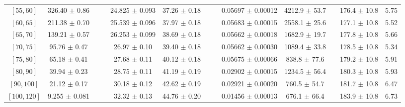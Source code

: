 \begin{tabular}{c||c|c|c|c|c|c|c|c|c|c|c||c}
$[55, 60]$ & 326.40 $\pm$ 0.86 &  &  & 24.825 $\pm$ 0.093 & 37.26 $\pm$ 0.18 &  &  & 0.05697 $\pm$ 0.00012 & 4212.9 $\pm$ 53.7 &  & 176.4 $\pm$ 10.8 & 5.75\\
$[60, 65]$ & 211.38 $\pm$ 0.70 &  &  & 25.539 $\pm$ 0.096 & 37.97 $\pm$ 0.18 &  &  & 0.05683 $\pm$ 0.00015 & 2558.1 $\pm$ 25.6 &  & 177.1 $\pm$ 10.8 & 5.52\\
$[65, 70]$ & 139.21 $\pm$ 0.57 &  &  & 26.253 $\pm$ 0.099 & 38.69 $\pm$ 0.18 &  &  & 0.05662 $\pm$ 0.00018 & 1682.9 $\pm$ 19.7 &  & 177.8 $\pm$ 10.8 & 5.66\\
$[70, 75]$ & 95.76 $\pm$ 0.47 &  &  & 26.97 $\pm$ 0.10 & 39.40 $\pm$ 0.18 &  &  & 0.05662 $\pm$ 0.00030 & 1089.4 $\pm$ 33.8 &  & 178.5 $\pm$ 10.8 & 5.34\\
$[75, 80]$ & 65.18 $\pm$ 0.41 &  &  & 27.68 $\pm$ 0.11 & 40.12 $\pm$ 0.18 &  &  & 0.05675 $\pm$ 0.00066 & 838.8 $\pm$ 77.6 &  & 179.2 $\pm$ 10.8 & 5.91\\
$[80, 90]$ & 39.94 $\pm$ 0.23 &  &  & 28.75 $\pm$ 0.11 & 41.19 $\pm$ 0.19 &  &  & 0.02902 $\pm$ 0.00015 & 1234.5 $\pm$ 56.4 &  & 180.3 $\pm$ 10.8 & 5.93\\
$[90, 100]$ & 21.12 $\pm$ 0.17 &  &  & 30.18 $\pm$ 0.12 & 42.62 $\pm$ 0.19 &  &  & 0.02921 $\pm$ 0.00020 & 760.5 $\pm$ 54.7 &  & 181.7 $\pm$ 10.8 & 6.47\\
$[100, 120]$ & 9.255 $\pm$ 0.081 &  &  & 32.32 $\pm$ 0.13 & 44.76 $\pm$ 0.20 &  &  & 0.01456 $\pm$ 0.00013 & 676.1 $\pm$ 66.4 &  & 183.9 $\pm$ 10.8 & 6.73\\
\end{tabular}
